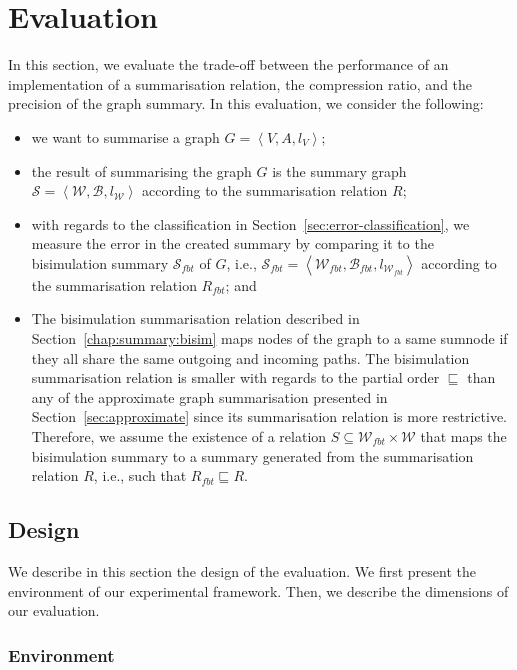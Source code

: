 \section{Evaluation}
\label{sec:eval}

In this section, we evaluate the trade-off between the performance of an implementation of a summarisation relation, the compression ratio, and the precision of the graph summary.
In this evaluation, we consider the following:
\begin{itemize}
	\item we want to summarise a graph $G=\left\langle V, A, l_V \right\rangle$;
	\item the result of summarising the graph $G$ is the summary graph $\mathcal{S} = \left\langle \mathcal{W}, \mathcal{B}, l_{\mathcal{W}} \right\rangle$ according to the summarisation relation $R$;
	\item with regards to the classification in Section~\ref{sec:error-classification}, we measure the error in the created summary by comparing it to the bisimulation summary $\mathcal{S}_{fbt}$ of $G$, i.e., $\mathcal{S}_{fbt} = \left\langle \mathcal{W}_{fbt}, \mathcal{B}_{fbt}, l_{\mathcal{W}_{fbt}} \right\rangle$ according to the summarisation relation $R_{fbt}$; and
	\item The bisimulation summarisation relation described in Section~\ref{chap:summary:bisim} maps nodes of the graph to a same sumnode if they all share the same outgoing and incoming paths. The bisimulation summarisation relation is smaller with regards to the partial order $\sqsubseteq$ than any of the approximate graph summarisation presented in Section~\ref{sec:approximate} since its summarisation relation is more restrictive. Therefore, we assume the existence of a relation $S \subseteq \mathcal{W}_{fbt} \times \mathcal{W}$ that maps the bisimulation summary to a summary generated from the summarisation relation $R$, i.e., such that $R_{fbt} \sqsubseteq R$.
\end{itemize}

\subsection{Design}
\label{sec:eval:design}

We describe in this section the design of the evaluation. We first present the environment of our experimental framework. Then, we describe the dimensions of our evaluation.

\subsubsection{Environment}

